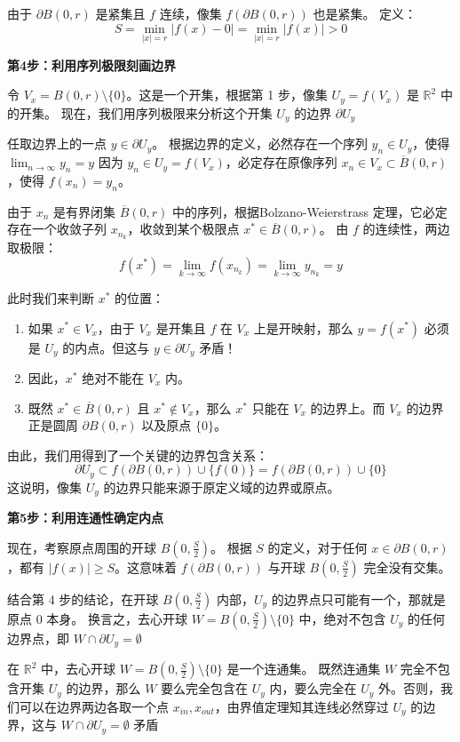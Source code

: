 \documentclass[12pt,a4paper]{ctexart}
\begin{document}
由于 $\partial B(0, r)$ 是紧集且 $f$ 连续，像集 $f(\partial B(0, r))$ 也是紧集。
定义：
\[
S = \min_{|x|=r} |f(x) - 0| = \min_{|x|=r} |f(x)| > 0
\]

\textbf{第4步：利用序列极限刻画边界}

令 $V_x = B(0, r) \setminus \{0\}$。这是一个开集，根据第 1 步，像集 $U_y = f(V_x)$ 是 $\mathbb{R}^2$ 中的开集。
现在，我们用序列极限来分析这个开集 $U_y$ 的边界 $\partial U_y$

任取边界上的一点 $y \in \partial U_y$。
根据边界的定义，必然存在一个序列 $y_n \in U_y$，使得 $\lim_{n \to \infty} y_n = y$
因为 $y_n \in U_y = f(V_x)$，必定存在原像序列 $x_n \in V_x \subset \overline{B}(0, r)$，使得 $f(x_n) = y_n$。

由于 $x_n$ 是有界闭集 $\overline{B}(0, r)$ 中的序列，根据Bolzano-Weierstrass 定理，它必定存在一个收敛子列 $x_{n_k}$，收敛到某个极限点 $x^* \in \overline{B}(0, r)$。
由 $f$ 的连续性，两边取极限：
\[
f(x^*) = \lim_{k \to \infty} f(x_{n_k}) = \lim_{k \to \infty} y_{n_k} = y
\]

此时我们来判断 $x^*$ 的位置：
\begin{enumerate}[label=\arabic*.,leftmargin=2.5em]
\item 如果 $x^* \in V_x$，由于 $V_x$ 是开集且 $f$ 在 $V_x$ 上是开映射，那么 $y = f(x^*)$ 必须是 $U_y$ 的内点。但这与 $y \in \partial U_y$ 矛盾！
\item 因此，$x^*$ 绝对不能在 $V_x$ 内。
\item 既然 $x^* \in \overline{B}(0, r)$ 且 $x^* \notin V_x$，那么 $x^*$ 只能在 $V_x$ 的边界上。而 $V_x$ 的边界正是圆周 $\partial B(0, r)$ 以及原点 $\{0\}$。
\end{enumerate}

由此，我们用得到了一个关键的边界包含关系：
\[
\partial U_y \subset f(\partial B(0, r)) \cup \{f(0)\} = f(\partial B(0, r)) \cup \{0\}
\]
这说明，像集 $U_y$ 的边界只能来源于原定义域的边界或原点。

\textbf{第5步：利用连通性确定内点}

现在，考察原点周围的开球 $B(0, \frac{S}{2})$。
根据 $S$ 的定义，对于任何 $x \in \partial B(0, r)$，都有 $|f(x)| \ge S$。这意味着 $f(\partial B(0, r))$ 与开球 $B(0, \frac{S}{2})$ 完全没有交集。

结合第 4 步的结论，在开球 $B(0, \frac{S}{2})$ 内部，$U_y$ 的边界点只可能有一个，那就是原点 $0$ 本身。
换言之，去心开球 $W = B(0, \frac{S}{2}) \setminus \{0\}$ 中，绝对不包含 $U_y$ 的任何边界点，即 $W\cap \partial U_y=\emptyset$

在 $\mathbb{R}^2$ 中，去心开球 $W = B(0, \frac{S}{2}) \setminus \{0\}$ 是一个连通集。
既然连通集 $W$ 完全不包含开集 $U_y$ 的边界，那么 $W$ 要么完全包含在 $U_y$ 内，要么完全在 $U_y$ 外。否则，我们可以在边界两边各取一个点 $x_{in},x_{out}$，由界值定理知其连线必然穿过 $U_y$ 的边界，这与 $W\cap \partial U_y=\emptyset$ 矛盾
\end{document}
